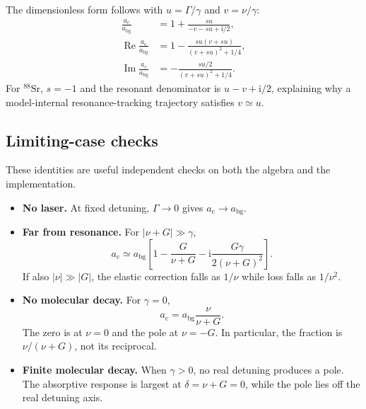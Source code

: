 \documentclass[9pt,a4paper,twocolumn,twoside]{rho-class/rho}
\newcommand{\ac}{a_{\mathrm{c}}}
\newcommand{\abg}{a_{\mathrm{bg}}}
\newcommand{\ii}{\mathrm{i}}
\begin{document}
        The dimensionless form follows with $u=\Gamma/\gamma$ and
        $v=\nu/\gamma$:
        \begin{align}
            \frac{\ac}{\abg}
            &=1+\frac{s u}{-v-s u+\ii/2},
            \label{eq:appendix-dimensionless-ac}\\
            \operatorname{Re}\frac{\ac}{\abg}
            &=1-\frac{s u(v+s u)}{(v+s u)^2+1/4},
            \label{eq:appendix-dimensionless-real}\\
            \operatorname{Im}\frac{\ac}{\abg}
            &=-\frac{s u/2}{(v+s u)^2+1/4}.
            \label{eq:appendix-dimensionless-imag}
        \end{align}
        For $^{88}\mathrm{Sr}$, $s=-1$ and the resonant denominator is
        $u-v+\ii/2$, explaining why a model-internal resonance-tracking
        trajectory satisfies $v\simeq u$.

    \subsection{Limiting-case checks}

        These identities are useful independent checks on both the algebra and
        the implementation.
        \begin{itemize}
            \item \textbf{No laser.} At fixed detuning,
            $\Gamma\rightarrow0$ gives $\ac\rightarrow\abg$.
            \item \textbf{Far from resonance.} For
            $|\nu+G|\gg\gamma$,
            \begin{equation}
                \ac\simeq\abg\left[1-\frac{G}{\nu+G}
                -\ii\frac{G\gamma}{2(\nu+G)^2}\right].
            \end{equation}
            If also $|\nu|\gg|G|$, the elastic correction falls as
            $1/\nu$ while loss falls as $1/\nu^2$.
            \item \textbf{No molecular decay.} For $\gamma=0$,
            \begin{equation}
                \ac=\abg\frac{\nu}{\nu+G}.
                \label{eq:appendix-lossless-limit}
            \end{equation}
            The zero is at $\nu=0$ and the pole at $\nu=-G$.  In particular,
            the fraction is $\nu/(\nu+G)$, not its reciprocal.
            \item \textbf{Finite molecular decay.} When $\gamma>0$, no real
            detuning produces a pole. The absorptive response is largest at
            $\delta=\nu+G=0$, while the pole lies off the real detuning axis.
        \end{itemize}
\end{document}
